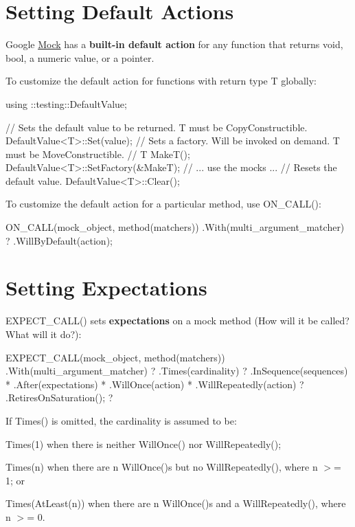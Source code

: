 \section*{Setting Default Actions}

Google \hyperlink{classMock}{Mock} has a {\bfseries built-\/in default action} for any function that returns {\ttfamily void}, {\ttfamily bool}, a numeric value, or a pointer.

To customize the default action for functions with return type {\ttfamily T} globally\+: 
\begin{DoxyCode}
using ::testing::DefaultValue;

\textcolor{comment}{// Sets the default value to be returned. T must be CopyConstructible.}
DefaultValue<T>::Set(value);
\textcolor{comment}{// Sets a factory. Will be invoked on demand. T must be MoveConstructible.}
\textcolor{comment}{//   T MakeT();}
DefaultValue<T>::SetFactory(&MakeT);
\textcolor{comment}{// ... use the mocks ...}
\textcolor{comment}{// Resets the default value.}
DefaultValue<T>::Clear();
\end{DoxyCode}


To customize the default action for a particular method, use {\ttfamily O\+N\+\_\+\+C\+A\+L\+L()}\+: 
\begin{DoxyCode}
ON\_CALL(mock\_object, method(matchers))
    .With(multi\_argument\_matcher)  ?
    .WillByDefault(action);
\end{DoxyCode}


\section*{Setting Expectations}

{\ttfamily E\+X\+P\+E\+C\+T\+\_\+\+C\+A\+L\+L()} sets {\bfseries expectations} on a mock method (How will it be called? What will it do?)\+: 
\begin{DoxyCode}
EXPECT\_CALL(mock\_object, method(matchers))
    .With(multi\_argument\_matcher)  ?
    .Times(cardinality)            ?
    .InSequence(sequences)         *
    .After(expectations)           *
    .WillOnce(action)              *
    .WillRepeatedly(action)        ?
    .RetiresOnSaturation();        ?
\end{DoxyCode}


If {\ttfamily Times()} is omitted, the cardinality is assumed to be\+:


\begin{DoxyItemize}
\item {\ttfamily Times(1)} when there is neither {\ttfamily Will\+Once()} nor {\ttfamily Will\+Repeatedly()};
\item {\ttfamily Times(n)} when there are {\ttfamily n Will\+Once()}s but no {\ttfamily Will\+Repeatedly()}, where {\ttfamily n} $>$= 1; or
\item {\ttfamily Times(\+At\+Least(n))} when there are {\ttfamily n Will\+Once()}s and a {\ttfamily Will\+Repeatedly()}, where {\ttfamily n} $>$= 0.
\end{DoxyItemize}

